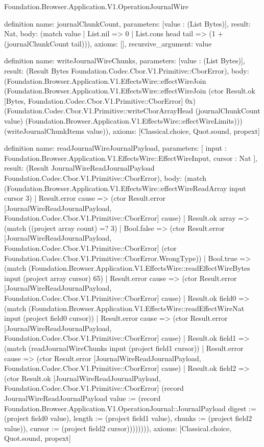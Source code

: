 \begin{lexlean}{Foundation.Browser.Application.V1.OperationJournalWire}
\begin{semanticmodule}
definition{
  name: journalChunkCount,
  parameters: [value : (List Bytes)],
  result: Nat,
  body: (match value | List.nil => 0 | List.cons head tail => (1 + (journalChunkCount tail))),
  axioms: [],
  recursive_argument: value
}

definition{
  name: writeJournalWireChunks,
  parameters: [value : (List Bytes)],
  result: (Result Bytes Foundation.Codec.Cbor.V1.Primitive::CborError),
  body: (Foundation.Browser.Application.V1.EffectsWire::effectWireJoin (Foundation.Browser.Application.V1.EffectsWire::effectWireJoin (ctor Result.ok [Bytes, Foundation.Codec.Cbor.V1.Primitive::CborError] 0x) (Foundation.Codec.Cbor.V1.Primitive::writeCborArrayHead (journalChunkCount value) (Foundation.Browser.Application.V1.EffectsWire::effectWireLimits))) (writeJournalChunkItems value)),
  axioms: [Classical.choice, Quot.sound, propext]
}

definition{
  name: readJournalWireJournalPayload,
  parameters: [
    input : Foundation.Browser.Application.V1.EffectsWire::EffectWireInput,
    cursor : Nat
  ],
  result: (Result JournalWireReadJournalPayload Foundation.Codec.Cbor.V1.Primitive::CborError),
  body: (match (Foundation.Browser.Application.V1.EffectsWire::effectWireReadArray input cursor 3)
    | Result.error cause => (ctor Result.error [JournalWireReadJournalPayload, Foundation.Codec.Cbor.V1.Primitive::CborError] cause)
    | Result.ok array => (match ((project array count) =? 3)
      | Bool.false => (ctor Result.error [JournalWireReadJournalPayload, Foundation.Codec.Cbor.V1.Primitive::CborError] (ctor Foundation.Codec.Cbor.V1.Primitive::CborError.WrongType))
      | Bool.true => (match (Foundation.Browser.Application.V1.EffectsWire::readEffectWireBytes input (project array cursor) 65)
        | Result.error cause => (ctor Result.error [JournalWireReadJournalPayload, Foundation.Codec.Cbor.V1.Primitive::CborError] cause)
        | Result.ok field0 => (match (Foundation.Browser.Application.V1.EffectsWire::readEffectWireNat input (project field0 cursor))
          | Result.error cause => (ctor Result.error [JournalWireReadJournalPayload, Foundation.Codec.Cbor.V1.Primitive::CborError] cause)
          | Result.ok field1 => (match (readJournalWireChunks input (project field1 cursor))
            | Result.error cause => (ctor Result.error [JournalWireReadJournalPayload, Foundation.Codec.Cbor.V1.Primitive::CborError] cause)
            | Result.ok field2 => (ctor Result.ok [JournalWireReadJournalPayload, Foundation.Codec.Cbor.V1.Primitive::CborError] (record JournalWireReadJournalPayload {value := (record Foundation.Browser.Application.V1.OperationJournal::JournalPayload {digest := (project field0 value), length := (project field1 value), chunks := (project field2 value)}), cursor := (project field2 cursor)}))))))),
  axioms: [Classical.choice, Quot.sound, propext]
}


\end{semanticmodule}
\end{lexlean}
